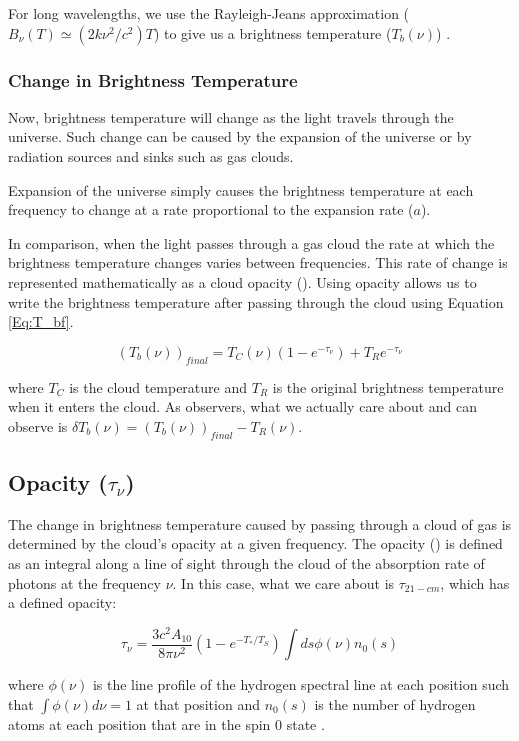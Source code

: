 For long wavelengths, we use the Rayleigh-Jeans approximation ($B_{\nu} (T) \simeq (2 k \nu^2 / c^2) T$) to give us a brightness temperature ($T_b (\nu)$) \cite{carroll2007}. 

\subsubsection{Change in Brightness Temperature}
Now, brightness temperature will change as the light travels through the universe. Such change can be caused by the expansion of the universe or by radiation sources and sinks such as gas clouds. 

Expansion of the universe simply causes the brightness temperature at each frequency to change at a rate proportional to the expansion rate ($a$). 

In comparison, when the light passes through a gas cloud the rate at which the brightness temperature changes varies between frequencies. This rate of change is represented mathematically as a cloud opacity (\tu). Using opacity allows us to write the brightness temperature after passing through the cloud using Equation \ref{Eq:T_bf}. 

\begin{equation}\label{Eq:T_bf}
(T_b (\nu))_{final}= T_{C} (\nu) (1-e^{-\tau_\nu}) +T_{R} e^{-\tau_\nu}
\end{equation}

where $T_{C}$ is the cloud temperature and $T_{R}$ is the original brightness temperature when it enters the cloud. As observers, what we actually care about and can observe is $\delta T_b (\nu) = (T_b (\nu))_{final} - T_R  (\nu)$. 

\subsection{Opacity ($\tau_\nu$)}
The change in brightness temperature caused by passing through a cloud of gas is determined by the cloud's opacity at a given frequency. The opacity (\tu) is defined as an integral along a line of sight through the cloud of the absorption rate of photons at the frequency $\nu$. In this case, what we care about is $\tau_{21-cm}$, which has a defined opacity:

\begin{equation} \label{Eq:tau}
\tau_{\nu} = \frac{3 c^2 A_{10}}{8 \pi \nu^2 } (1-e^{-T_*/T_S}) \int ds \phi (\nu) n_0(s)
\end{equation}

where $\phi (\nu)$ is the line profile of the hydrogen \cm spectral line at each position such that $\int \phi(\nu) d \nu = 1$ at that position and $n_0 (s)$ is the number of hydrogen atoms at each position that are in the spin 0 state \cite{furlanetto_2006}. 

